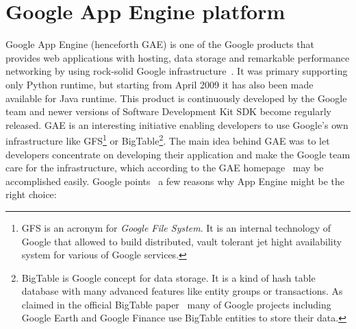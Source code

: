 \section{Google App Engine platform}\label{sec:gae_general}
Google App Engine (henceforth GAE) is one of the Google products that provides web applications with hosting, data storage and remarkable performance networking by using rock-solid Google infrastructure~\cite[page 1]{gae_develop}. It was primary supporting only Python runtime, but starting from April 2009 it has also been made available for Java runtime. This product is continuously developed by the Google team and newer versions of Software Development Kit SDK become regularly released. GAE is an interesting initiative enabling developers to use Google's own infrastructure like GFS\footnote{GFS is an acronym for \textit{Google File System}. It is an internal technology of Google that allowed to build distributed, vault tolerant jet hight availability system for various of Google services.} or BigTable\footnote{BigTable is Google concept for data storage. It is a kind of hash table database with many advanced features like entity groups or transactions. As claimed in the official BigTable paper~\cite{bigtable_about} many of Google projects including Google Earth and Google Finance use BigTable entities to store their data.}. The main idea behind GAE was to let developers concentrate on developing their application and make the Google team care for the infrastructure, which according to the GAE homepage~\cite{gae_homepage} may be accomplished easily. Google points~\cite{gae_why} a few reasons why App Engine might be the right choice: 
